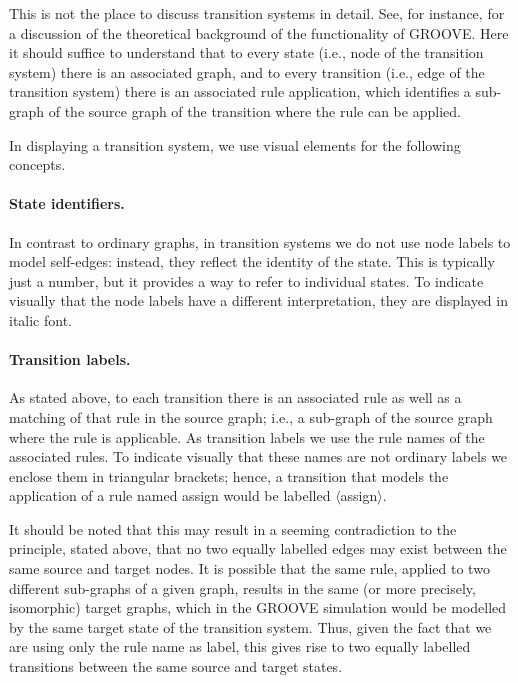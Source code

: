 This is not the place to discuss transition systems in detail. See, for
instance, \cite{Rensink2003a} for a discussion of the theoretical background of the
functionality of GROOVE. Here it should suffice to understand that to every
state (i.e., node of the transition system) there is an associated graph, and
to every transition (i.e., edge of the transition system) there is an
associated rule application, which identifies a sub-graph of the source graph
of the transition where the rule can be applied.

In displaying a transition system, we use visual elements for the
following concepts.

\paragraph{State identifiers.}

In contrast to ordinary graphs, in transition systems we do not use node labels
to model self-edges: instead, they reflect the identity of the state. This is
typically just a number, but it provides a way to refer to individual
states. To indicate visually that the node labels have a different
interpretation, they are displayed in italic font.

\paragraph{Transition labels.}

As stated above, to each transition there is an associated rule as well as a
matching of that rule in the source graph; i.e., a sub-graph of the source
graph where the rule is applicable. As transition labels we use the rule names
of the associated rules. To indicate visually that these names are not ordinary
labels we enclose them in triangular brackets; hence, a transition that models
the application of a rule named \textsf{assign} would be labelled
\textsf{$\langle$assign$\rangle$}.

It should be noted that this may result in a seeming contradiction to the
principle, stated above, that no two equally labelled edges may exist between
the same source and target nodes. It is possible that the same rule, applied to
two different sub-graphs of a given graph, results in the same (or more
precisely, isomorphic) target graphs, which in the GROOVE simulation would be
modelled by the same target state of the transition system. Thus, given the
fact that we are using only the rule name as label, this gives rise to two
equally labelled transitions between the same source and target states.

